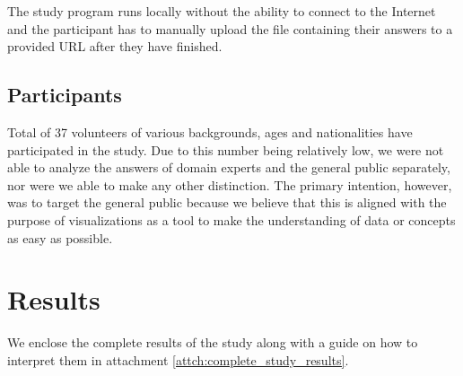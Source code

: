 The study program runs locally without the ability to connect to the Internet and the participant has to manually upload the file containing their answers to a provided URL after they have finished.

\subsection{Participants}
\label{subsec:user_study-setting-participants}

Total of 37 volunteers of various backgrounds, ages and nationalities have participated in the study. Due to this number being relatively low, we were not able to analyze the answers of domain experts and the general public separately, nor were we able to make any other distinction. The primary intention, however, was to target the general public because we believe that this is aligned with the purpose of visualizations as a tool to make the understanding of data or concepts as easy as possible.

\section{Results}
\label{sec:user_study-results}

We enclose the complete results of the study along with a guide on how to interpret them in attachment \ref{attch:complete_study_results}.